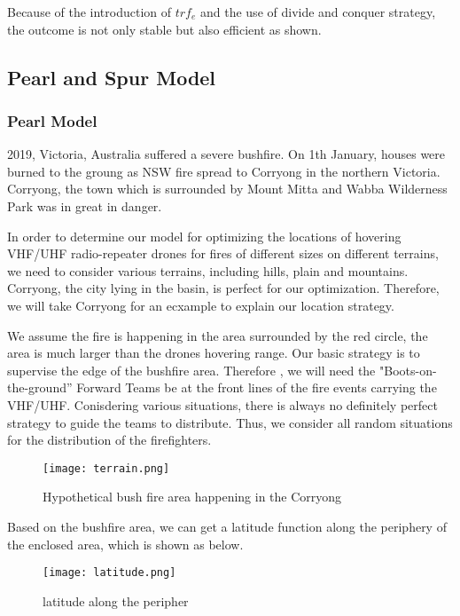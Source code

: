 \documentclass[../main]{subfiles}
\begin{document}
Because of the introduction of \(trf_e\) and the use of divide and
conquer strategy, the outcome is not only stable but also efficient as
shown.


\subsection{Pearl and Spur Model}
\subsubsection{Pearl Model}

2019, Victoria, Australia suffered a severe bushfire. On 1th January,
houses were burned to the groung as NSW fire spread to Corryong in the
northern Victoria. Corryong, the town which is surrounded by Mount Mitta
and Wabba Wilderness Park was in great in danger.

In order to determine our model for optimizing the locations of hovering
VHF/UHF radio-repeater drones for fires of different sizes on different
terrains, we need to consider various terrains, including hills, plain
and mountains. Corryong, the city lying in the basin, is perfect for our
optimization. Therefore, we will take Corryong for an ecxample to
explain our location strategy.

We assume the fire is happening in the area surrounded by the red
circle, the area is much larger than the drones hovering range. Our
basic strategy is to supervise the edge of the bushfire area. Therefore
, we will need the "Boots-on-the-ground'' Forward Teams be at the front
lines of the fire events carrying the VHF/UHF. Conisdering various
situations, there is always no definitely perfect strategy to guide the
teams to distribute. Thus, we consider all random situations for the
distribution of the firefighters.

\begin{figure}[h!]
      \centering
      \texttt{[image: terrain.png]}
      \caption{Hypothetical bush fire area happening in the Corryong}
    \end{figure}

Based on the bushfire area, we can get a latitude function along the
periphery of the enclosed area, which is shown as below.
\begin{figure}[h!]
      \centering
      \captionsetup{justification=centering}
      \texttt{[image: latitude.png]}
      \caption{latitude along the peripher}
      \end{figure}
    
\end{document}
